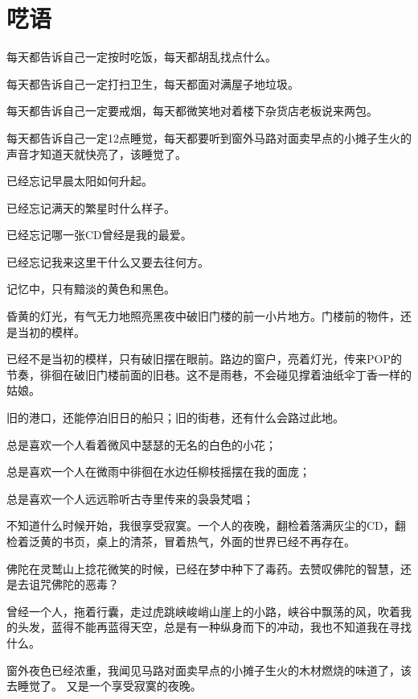 \chapter[呓语]{呓\qquad 语}


每天都告诉自己一定按时吃饭，每天都胡乱找点什么。

每天都告诉自己一定打扫卫生，每天都面对满屋子地垃圾。

每天都告诉自己一定要戒烟，每天都微笑地对着楼下杂货店老板说来两包。

每天都告诉自己一定12点睡觉，每天都要听到窗外马路对面卖早点的小摊子生火的声音才知道天就快亮了，该睡觉了。

\pskip
已经忘记早晨太阳如何升起。

已经忘记满天的繁星时什么样子。

已经忘记哪一张CD曾经是我的最爱。

已经忘记我来这里干什么又要去往何方。

\pskip
记忆中，只有黯淡的黄色和黑色。

昏黄的灯光，有气无力地照亮黑夜中破旧门楼的前一小片地方。门楼前的物件，还是当初的模样。

已经不是当初的模样，只有破旧摆在眼前。路边的窗户，亮着灯光，传来POP的节奏，徘徊在破旧门楼前面的旧巷。这不是雨巷，不会碰见撑着油纸伞丁香一样的姑娘。

旧的港口，还能停泊旧日的船只；旧的街巷，还有什么会路过此地。


总是喜欢一个人看着微风中瑟瑟的无名的白色的小花；

总是喜欢一个人在微雨中徘徊在水边任柳枝摇摆在我的面庞；

总是喜欢一个人远远聆听古寺里传来的袅袅梵唱；

\pskip
不知道什么时候开始，我很享受寂寞。一个人的夜晚，翻检着落满灰尘的CD，翻检着泛黄的书页，桌上的清茶，冒着热气，外面的世界已经不再存在。

佛陀在灵鹫山上捻花微笑的时候，已经在梦中种下了毒药。去赞叹佛陀的智慧，还是去诅咒佛陀的恶毒？

曾经一个人，拖着行囊，走过虎跳峡峻峭山崖上的小路，峡谷中飘荡的风，吹着我的头发，蓝得不能再蓝得天空，总是有一种纵身而下的冲动，我也不知道我在寻找什么。

\pskip
窗外夜色已经浓重，我闻见马路对面卖早点的小摊子生火的木材燃烧的味道了，该去睡觉了。
又是一个享受寂寞的夜晚。


